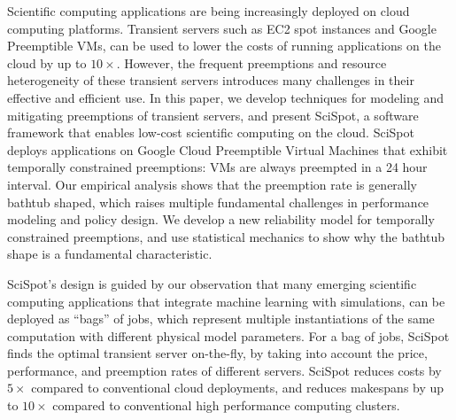 Scientific computing applications are being increasingly deployed on cloud computing platforms.
Transient servers such as EC2 spot instances and Google Preemptible VMs, can be used to lower the costs of running applications on the cloud by up to $10\times$. 
However, the frequent preemptions and resource heterogeneity of these transient servers introduces many challenges in their effective and efficient use. 
In this paper, we develop techniques for modeling and mitigating preemptions of transient servers, and present SciSpot, a software framework that enables low-cost scientific computing on the cloud. 
SciSpot deploys applications on Google Cloud Preemptible Virtual Machines that exhibit temporally constrained preemptions: VMs are always preempted in a 24 hour interval. 
Our empirical analysis shows that the preemption rate is generally  bathtub shaped, which raises multiple fundamental challenges in performance modeling and policy design. 
We develop a new reliability model for temporally constrained preemptions, and use statistical mechanics to show why the bathtub shape is a fundamental characteristic. 


SciSpot's design is guided by our observation that many emerging scientific computing applications that integrate machine learning with simulations, can be deployed as ``bags'' of jobs, which represent multiple instantiations of the same computation with different physical model parameters. 
For a bag of jobs, SciSpot finds the optimal transient server on-the-fly, by taking into account the price, performance, and preemption rates of different servers. 
SciSpot reduces costs by $5\times$ compared to conventional cloud deployments, and reduces  makespans by up to $10\times$ compared to conventional high performance computing clusters.



